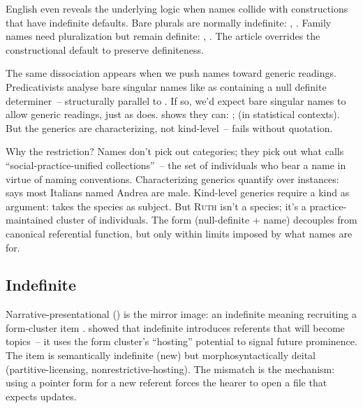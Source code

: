 English even reveals the underlying logic when names collide with constructions that have indefinite defaults. Bare plurals are normally indefinite: , . Family names need pluralization but remain definite: , . The article overrides the constructional default to preserve definiteness.

The same dissociation appears when we push names toward generic readings. Predicativists analyse bare singular names like  as containing a null definite determiner~-- structurally parallel to . If so, we'd expect bare singular names to allow generic readings, just as  does. \textcite{gasparri2025} shows they can: ;  (in statistical contexts). But the generics are characterizing, not kind-level~--  fails without quotation.

Why the restriction? Names don't pick out categories; they pick out what \textcite{dupre1993} calls \enquote{social-practice-unified collections}~-- the set of individuals who bear a name in virtue of naming conventions. Characterizing generics quantify over instances:  says most Italians named Andrea are male. Kind-level generics require a kind as argument:  takes the species as subject. But \textsc{Ruth} isn't a species; it's a practice-maintained cluster of individuals. The form (null-definite + name) decouples from canonical referential function, but only within limits imposed by what names are for.

\subsection{Indefinite }
\label{sec:10:indefinite-this}

Narrative-presentational  () is the mirror image: an indefinite meaning recruiting a form-cluster item \citep{prince1981}. \textcite{prince1981} showed that indefinite  introduces referents that will become topics~-- it uses the form cluster's \enquote{hosting} potential to signal future prominence. The item is semantically indefinite (new) but morphosyntactically deital (partitive-licensing, nonrestrictive-hosting). The mismatch is the mechanism: using a pointer form for a new referent forces the hearer to open a file that expects updates.

